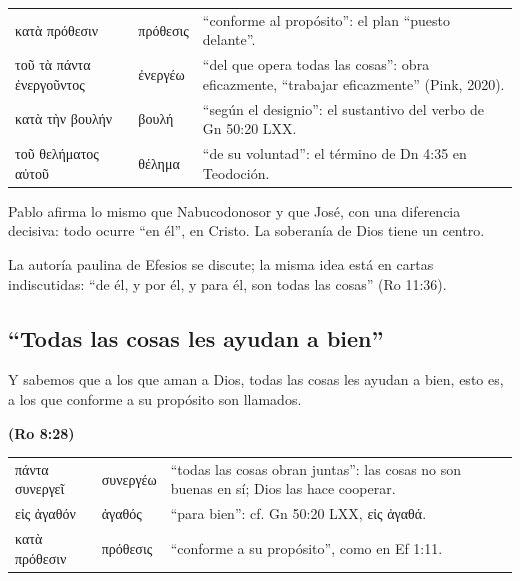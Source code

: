 \documentclass[11pt,letterpaper]{article}
\newcommand{\grc}[1]{\foreignlanguage{ancientgreek}{#1}}
\newcommand{\fuente}[1]{\par\hfill{\upshape\bfseries\small\textcolor{azul}{#1}}}
\begin{document}
\begin{filologia}[Ef 1:11]
\begin{tabular}{@{}L{4.2cm}L{1.6cm}L{9cm}@{}}
\grc{κατὰ πρόθεσιν} & \grc{πρόθεσις} & ``conforme al propósito'': el plan ``puesto delante''. \\[2pt]
\grc{τοῦ τὰ πάντα ἐνεργοῦντος} & \grc{ἐνεργέω} & ``del que opera todas las cosas'': obra eficazmente, ``trabajar eficazmente'' (Pink, 2020). \\[2pt]
\grc{κατὰ τὴν βουλήν} & \grc{βουλή} & ``según el designio'': el sustantivo del verbo de Gn 50:20 LXX. \\[2pt]
\grc{τοῦ θελήματος αὐτοῦ} & \grc{θέλημα} & ``de su voluntad'': el término de Dn 4:35 en Teodoción. \\
\end{tabular}
\end{filologia}

Pablo afirma lo mismo que Nabucodonosor y que José, con una diferencia decisiva: todo ocurre ``en él'', en Cristo. La soberanía de Dios tiene un centro.

\begin{nota}[Precisión]
La autoría paulina de Efesios se discute; la misma idea está en cartas indiscutidas: ``de él, y por él, y para él, son todas las cosas'' (Ro 11:36).
\end{nota}

\subsection{``Todas las cosas les ayudan a bien''}
\begin{cita}Y sabemos que a los que aman a Dios, todas las cosas les ayudan a bien, esto es, a los que conforme a su propósito son llamados.\fuente{(Ro 8:28)}\end{cita}

\begin{filologia}[Ro 8:28]
\begin{tabular}{@{}L{4.2cm}L{1.6cm}L{9cm}@{}}
\grc{πάντα συνεργεῖ} & \grc{συνεργέω} & ``todas las cosas obran juntas'': las cosas no son buenas en sí; Dios las hace cooperar. \\[2pt]
\grc{εἰς ἀγαθόν} & \grc{ἀγαθός} & ``para bien'': cf. Gn 50:20 LXX, \grc{εἰς ἀγαθά}. \\[2pt]
\grc{κατὰ πρόθεσιν} & \grc{πρόθεσις} & ``conforme a su propósito'', como en Ef 1:11. \\
\end{tabular}
\end{filologia}
\end{document}
